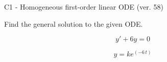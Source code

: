 \begin{exercise}
  \begin{exerciseTitle}C1 - Homogeneous first-order linear ODE (ver. 58)\end{exerciseTitle}
  \begin{exerciseStatement}
    
Find the general solution to the given ODE.

    
\[y'+6y=0\]

  \end{exerciseStatement}
  \begin{exerciseAnswer}
    
\[y= k e^{\left(-6 \, t\right)}\]

  \end{exerciseAnswer}
\end{exercise}
